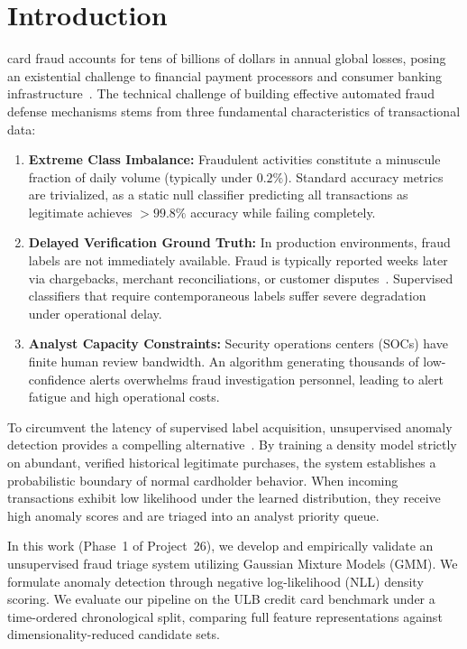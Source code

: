 \documentclass[10pt,journal,compsoc]{IEEEtran}
\begin{document}
\maketitle
\IEEEdisplaynontitleabstractindextext
\IEEEpeerreviewmaketitle

\section{Introduction}
 card fraud accounts for tens of billions of dollars in annual global losses, posing an existential challenge to financial payment processors and consumer banking infrastructure~\cite{dalpozzolo2018credit}. The technical challenge of building effective automated fraud defense mechanisms stems from three fundamental characteristics of transactional data:
\begin{enumerate}
    \item \textbf{Extreme Class Imbalance:} Fraudulent activities constitute a minuscule fraction of daily volume (typically under $0.2\%$). Standard accuracy metrics are trivialized, as a static null classifier predicting all transactions as legitimate achieves $>99.8\%$ accuracy while failing completely.
    \item \textbf{Delayed Verification Ground Truth:} In production environments, fraud labels are not immediately available. Fraud is typically reported weeks later via chargebacks, merchant reconciliations, or customer disputes~\cite{carcillo2018scarff}. Supervised classifiers that require contemporaneous labels suffer severe degradation under operational delay.
    \item \textbf{Analyst Capacity Constraints:} Security operations centers (SOCs) have finite human review bandwidth. An algorithm generating thousands of low-confidence alerts overwhelms fraud investigation personnel, leading to alert fatigue and high operational costs.
\end{enumerate}

To circumvent the latency of supervised label acquisition, unsupervised anomaly detection provides a compelling alternative~\cite{chandola2009anomaly}. By training a density model strictly on abundant, verified historical legitimate purchases, the system establishes a probabilistic boundary of normal cardholder behavior. When incoming transactions exhibit low likelihood under the learned distribution, they receive high anomaly scores and are triaged into an analyst priority queue.

In this work (Phase~1 of Project~26), we develop and empirically validate an unsupervised fraud triage system utilizing Gaussian Mixture Models (GMM). We formulate anomaly detection through negative log-likelihood (NLL) density scoring. We evaluate our pipeline on the ULB credit card benchmark under a time-ordered chronological split, comparing full feature representations against dimensionality-reduced candidate sets.
\end{document}
